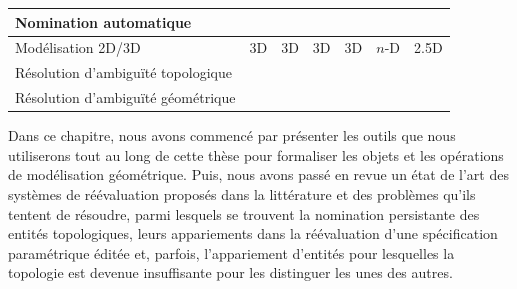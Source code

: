 \begin{table}
\begin{tabularx}{\textwidth}{|p{4.55cm}||Y|Y|Y|Y|Y|Y|}
		Nomination  automatique                                                              & \cmark                  & \cmark                  & \cmark                  & \cmark                  & \cmark                                                              & \xmark                                                  \\
		\hline
		Modélisation 2D/3D                                                                   & 3D                      & 3D                      & 3D                      & 3D                      & \(n\)-D                                                             & 2.5D                                                    \\
		\hline
		Résolution  d'ambiguïté topologique                                                  & \cmark                  & \cmark                  & \cmark                  & \cmark                  & \cmark                                                              & \cmark                                                  \\
		\hline %
		Résolution  d'ambiguïté géométrique                                                  & \cmark                  & \cmark                  & \cmark                  & \cmark                  & \xmark                                                              & \cmark                                                  \\
		\hline %
	\end{tabularx}
\end{table}

Dans ce chapitre, nous avons commencé par présenter les outils que nous
utiliserons tout au long de cette thèse pour formaliser les objets et les
opérations de modélisation géométrique. Puis, nous avons passé en revue un état
de l'art des systèmes de réévaluation proposés dans la littérature et des
problèmes qu'ils tentent de résoudre, parmi lesquels se trouvent la nomination
persistante des entités topologiques, leurs appariements dans la réévaluation
d'une spécification paramétrique éditée et, parfois, l'appariement d'entités pour
lesquelles la topologie est devenue insuffisante pour les distinguer les unes
des autres. %

